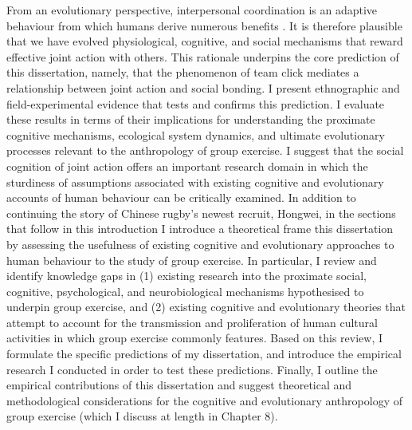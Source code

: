 From an evolutionary perspective, interpersonal coordination is an adaptive behaviour from which humans derive numerous benefits \citep{Tomasello2014}. It is therefore plausible that we have evolved physiological, cognitive, and social mechanisms that reward effective joint action with others. This rationale underpins the core prediction of this dissertation, namely, that the phenomenon of team click mediates a relationship between joint action and social bonding.  I present ethnographic and field-experimental evidence that tests and confirms this prediction.  I evaluate these results in terms of their implications for understanding the proximate cognitive mechanisms, ecological system dynamics, and ultimate evolutionary processes relevant to the anthropology of group exercise.  I suggest that the social cognition of joint action offers an important research domain in which the sturdiness of assumptions associated with existing cognitive and evolutionary accounts of human behaviour can be critically examined.
In addition to continuing the story of Chinese rugby's newest recruit, Hongwei, in the sections that follow in this introduction I introduce a theoretical frame this dissertation by assessing the usefulness of existing cognitive and evolutionary approaches to human behaviour to the study of group exercise. In particular, I review and identify knowledge gaps in (1) existing research into the proximate social, cognitive, psychological, and neurobiological mechanisms hypothesised to underpin group exercise, and (2) existing cognitive and evolutionary theories that attempt to account for the transmission and proliferation of human cultural activities in which group exercise commonly features. Based on this review, I formulate the specific predictions of my dissertation, and introduce the empirical research I conducted in order to test these predictions.  Finally, I outline the empirical contributions of this dissertation and suggest theoretical and methodological considerations for the cognitive and evolutionary anthropology of group exercise (which I discuss at length in Chapter 8).


